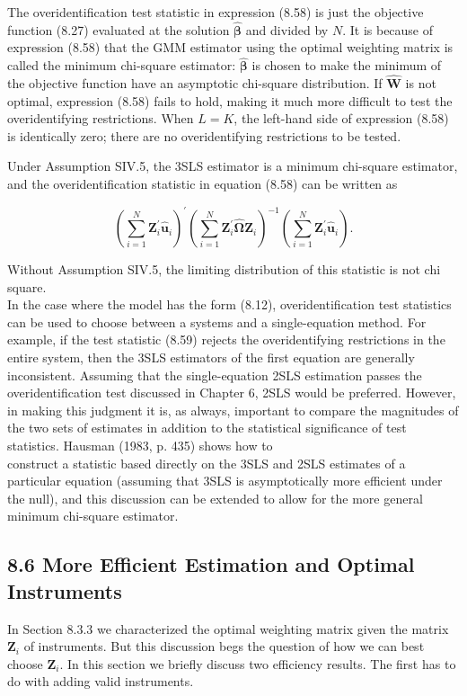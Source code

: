 \documentclass[10pt]{article}
\begin{document}
The overidentification test statistic in expression (8.58) is just the objective function (8.27) evaluated at the solution $\hat{\boldsymbol{\beta}}$ and divided by $N$. It is because of expression (8.58) that the GMM estimator using the optimal weighting matrix is called the minimum chi-square estimator: $\hat{\boldsymbol{\beta}}$ is chosen to make the minimum of the objective function have an asymptotic chi-square distribution. If $\hat{\mathbf{W}}$ is not optimal, expression (8.58) fails to hold, making it much more difficult to test the overidentifying restrictions. When $L=K$, the left-hand side of expression (8.58) is identically zero; there are no overidentifying restrictions to be tested.

Under Assumption SIV.5, the 3SLS estimator is a minimum chi-square estimator, and the overidentification statistic in equation (8.58) can be written as


\begin{equation*}
\left(\sum_{i=1}^{N} \mathbf{Z}_{i}^{\prime} \hat{\mathbf{u}}_{i}\right)^{\prime}\left(\sum_{i=1}^{N} \mathbf{Z}_{i}^{\prime} \hat{\mathbf{\Omega}} \mathbf{Z}_{i}\right)^{-1}\left(\sum_{i=1}^{N} \mathbf{Z}_{i}^{\prime} \hat{\mathbf{u}}_{i}\right) . \tag{8.59}
\end{equation*}


Without Assumption SIV.5, the limiting distribution of this statistic is not chi square.\\
In the case where the model has the form (8.12), overidentification test statistics can be used to choose between a systems and a single-equation method. For example, if the test statistic (8.59) rejects the overidentifying restrictions in the entire system, then the 3SLS estimators of the first equation are generally inconsistent. Assuming that the single-equation 2SLS estimation passes the overidentification test discussed in Chapter 6, 2SLS would be preferred. However, in making this judgment it is, as always, important to compare the magnitudes of the two sets of estimates in addition to the statistical significance of test statistics. Hausman (1983, p. 435) shows how to\\
construct a statistic based directly on the 3SLS and 2SLS estimates of a particular equation (assuming that 3SLS is asymptotically more efficient under the null), and this discussion can be extended to allow for the more general minimum chi-square estimator.

\subsection*{8.6 More Efficient Estimation and Optimal Instruments}
In Section 8.3.3 we characterized the optimal weighting matrix given the matrix $\mathbf{Z}_{i}$ of instruments. But this discussion begs the question of how we can best choose $\mathbf{Z}_{i}$. In this section we briefly discuss two efficiency results. The first has to do with adding valid instruments.
\end{document}
